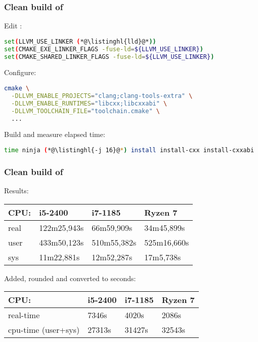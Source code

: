 \documentclass[compress,table,xcolor=table]{beamer}
\begin{document}
\begin{frame}[fragile]
  \frametitle{Clean build of }
  Edit :
  \begin{lstlisting}[language=bash,basicstyle=\scriptsize\ttfamily]
set(LLVM_USE_LINKER (*@\listinghl{lld}@*))
set(CMAKE_EXE_LINKER_FLAGS -fuse-ld=${LLVM_USE_LINKER})
set(CMAKE_SHARED_LINKER_FLAGS -fuse-ld=${LLVM_USE_LINKER})
  \end{lstlisting}
  Configure:
  \begin{lstlisting}[language=bash,basicstyle=\footnotesize\ttfamily]
cmake \
  -DLLVM_ENABLE_PROJECTS="clang;clang-tools-extra" \
  -DLLVM_ENABLE_RUNTIMES="libcxx;libcxxabi" \
  -DLLVM_TOOLCHAIN_FILE="toolchain.cmake" \
  ...
  \end{lstlisting}
  Build and measure elapsed time:
  \begin{lstlisting}[language=bash,basicstyle=\footnotesize\ttfamily]
time ninja (*@\listinghl{-j 16}@*) install install-cxx install-cxxabi
  \end{lstlisting}
\end{frame}
\begin{frame}
  \frametitle{Clean build of }
  \Large
  Results:
  \normalsize
  \begin{center}
  {
    \begin{tabular}{|p{3cm}|p{2cm}|p{2cm}|p{2cm}|}
    \hline
      CPU: & i5-2400 & i7-1185 & Ryzen 7 \\
    \hline
      real & 122m25,943s &  66m59,909s &  34m45,899s \\
      user & 433m50,123s & 510m55,382s & 525m16,660s \\
      sys  &  11m22,881s &  12m52,287s &  17m5,738s  \\
    \hline
    \end{tabular}
  }
  \end{center}
  \vfill
  \Large
  Added, rounded and converted to seconds:
  \normalsize
  \begin{center}
  {
    \begin{tabular}{|p{3.5cm}|p{1.5cm}|p{1.5cm}|p{1.5cm}|}
    \hline
      CPU: & i5-2400 & i7-1185 & Ryzen 7 \\
    \hline
      real-time           &  7346s &  4020s &  2086s \\
      cpu-time (user+sys) & 27313s & 31427s & 32543s \\
    \hline
    \end{tabular}
  }
  \end{center}
\end{frame}
\end{document}
